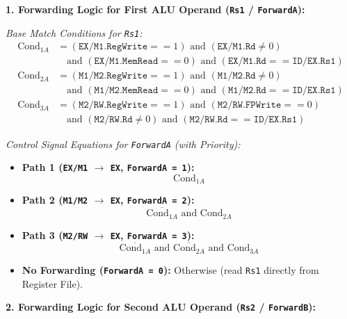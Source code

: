 \documentclass[11pt, a4paper]{article}
\begin{document}
\textbf{1. Forwarding Logic for First ALU Operand (\texttt{Rs1} / \texttt{ForwardA}):}

\textit{Base Match Conditions for \texttt{Rs1}:}
\begin{align*}
    \text{Cond}_{1A} &= (\texttt{EX/M1.RegWrite} == 1) \text{ and } (\texttt{EX/M1.Rd} \neq 0) \\
                     &\quad \text{and } (\texttt{EX/M1.MemRead} == 0) \text{ and } (\texttt{EX/M1.Rd} == \texttt{ID/EX.Rs1}) \\
    \text{Cond}_{2A} &= (\texttt{M1/M2.RegWrite} == 1) \text{ and } (\texttt{M1/M2.Rd} \neq 0) \\
                     &\quad \text{and } (\texttt{M1/M2.MemRead} == 0) \text{ and } (\texttt{M1/M2.Rd} == \texttt{ID/EX.Rs1}) \\
    \text{Cond}_{3A} &= (\texttt{M2/RW.RegWrite} == 1) \text{ and } (\texttt{M2/RW.FPWrite} == 0) \\
                     &\quad \text{and } (\texttt{M2/RW.Rd} \neq 0) \text{ and } (\texttt{M2/RW.Rd} == \texttt{ID/EX.Rs1})
\end{align*}

\textit{Control Signal Equations for \texttt{ForwardA} (with Priority):}
\begin{itemize}[noitemsep, topsep=2pt]
    \item \textbf{Path 1 (\texttt{EX/M1} $\rightarrow$ \texttt{EX}, \texttt{ForwardA = 1}):}
    \[
        \text{Cond}_{1A}
    \]
    \item \textbf{Path 2 (\texttt{M1/M2} $\rightarrow$ \texttt{EX}, \texttt{ForwardA = 2}):}
    \[
        \overline{\text{Cond}_{1A}} \text{ and } \text{Cond}_{2A}
    \]
    \item \textbf{Path 3 (\texttt{M2/RW} $\rightarrow$ \texttt{EX}, \texttt{ForwardA = 3}):}
    \[
        \overline{\text{Cond}_{1A}} \text{ and } \overline{\text{Cond}_{2A}} \text{ and } \text{Cond}_{3A}
    \]
    \item \textbf{No Forwarding (\texttt{ForwardA = 0}):} Otherwise (read \texttt{Rs1} directly from Register File).
\end{itemize}

\vspace{4pt}
\textbf{2. Forwarding Logic for Second ALU Operand (\texttt{Rs2} / \texttt{ForwardB}):}
\end{document}
